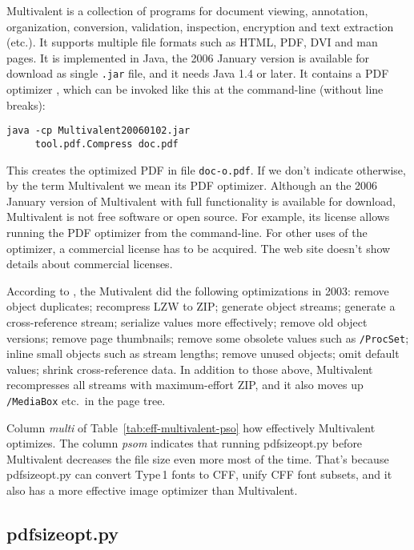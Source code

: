 \documentclass{ltugproc}
\def\cmd{\textsf}
\begin{document}
Multivalent \cite{multivalent} is a collection of programs for document
viewing, annotation, organization, conversion, validation, inspection,
encryption and text extraction (etc.). It supports multiple file formats
such as HTML, PDF, DVI and man pages. It is implemented in Java, the 2006
January version is available for download \cite{multivalent-download}
as single \texttt{.jar} file, and
it needs Java 1.4 or later. It contains a PDF optimizer
\cite{multivalent-compress-tool,pdf-diet},
which can be invoked like this at the command-line (without line breaks):
\begin{verbatim}
java -cp Multivalent20060102.jar
     tool.pdf.Compress doc.pdf
\end{verbatim}\noindent
This
creates the optimized PDF in file \texttt{doc-o.pdf}. If we don't indicate
otherwise, by the term Multivalent we mean its PDF optimizer. Although an
the 2006 January version of Multivalent with full functionality is available
for download, Multivalent is not free software or open source. For example,
its license allows running the PDF optimizer from the command-line. For
other uses of the optimizer, a commercial license has to be acquired. The
web site doesn't show details about commercial licenses.

According to \cite{pdf-diet}, the Mutivalent did the
following optimizations in 2003:
remove object duplicates;
recompress LZW to ZIP;
generate object streams;
generate a cross-reference stream;
serialize values more effectively;
remove old object versions;
remove page thumbnails;
remove some obsolete values such as \texttt{/ProcSet};
inline small objects such as stream lengths;
remove unused objects;
omit default values;
shrink cross-reference data.
In addition to those above, Multivalent recompresses all streams with
maximum-effort ZIP, and it also moves up \texttt{/MediaBox} etc.\ in the
page tree.

Column \emph{multi} of Table~\ref{tab:eff-multivalent-pso} how effectively
Multivalent optimizes. The column \emph{psom} indicates that running
\cmd{pdfsizeopt.py} before Multivalent decreases the file size even more
most of the time. That's because \cmd{pdfsizeopt.py} can convert Type\,1
fonts to CFF, unify CFF font subsets, and it also has a more effective image
optimizer than Multivalent.



\subsection{pdfsizeopt.py}
\end{document}
